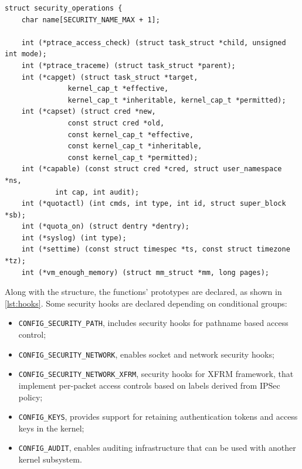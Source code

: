 \documentclass[]{article}
\begin{document}
\begin{lstlisting}[frame=none, numbers=none, caption=Security structure declaration (Linux kernel v3.11), label=lst:struct_ops]
struct security_operations {
	char name[SECURITY_NAME_MAX + 1];

	int (*ptrace_access_check) (struct task_struct *child, unsigned int mode);
	int (*ptrace_traceme) (struct task_struct *parent);
	int (*capget) (struct task_struct *target,
		       kernel_cap_t *effective,
		       kernel_cap_t *inheritable, kernel_cap_t *permitted);
	int (*capset) (struct cred *new,
		       const struct cred *old,
		       const kernel_cap_t *effective,
		       const kernel_cap_t *inheritable,
		       const kernel_cap_t *permitted);
	int (*capable) (const struct cred *cred, struct user_namespace *ns,
			int cap, int audit);
	int (*quotactl) (int cmds, int type, int id, struct super_block *sb);
	int (*quota_on) (struct dentry *dentry);
	int (*syslog) (int type);
	int (*settime) (const struct timespec *ts, const struct timezone *tz);
	int (*vm_enough_memory) (struct mm_struct *mm, long pages);
\end{lstlisting}

\noindent
Along with the structure, the functions' prototypes are declared, as shown in \autoref{lst:hooks}. Some security hooks are declared depending on conditional groups:

\begin{itemize}
 \item \texttt{CONFIG\_SECURITY\_PATH}, includes security hooks for pathname based access control;
 \item \texttt{CONFIG\_SECURITY\_NETWORK}, enables socket and network security hooks;
 \item \texttt{CONFIG\_SECURITY\_NETWORK\_XFRM}, security hooks for XFRM framework, that implement per-packet access controls based on labels derived from IPSec policy;
\item \texttt{CONFIG\_KEYS}, provides support for retaining authentication tokens and access keys in the kernel;
\item \texttt{CONFIG\_AUDIT}, enables auditing infrastructure that can be used with another kernel subsystem.
\end{itemize}
\end{document}
